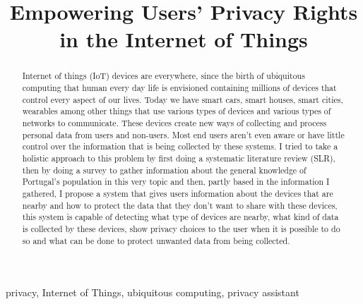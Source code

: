 \documentclass[conference]{IEEEtran}
\begin{document}
\title{Empowering Users' Privacy Rights in the Internet of Things\\
}

\author{
}

\maketitle

\begin{abstract}
Internet of things (IoT) devices are everywhere, since the birth of ubiquitous
computing that human every day life is envisioned containing millions of devices
that control every aspect of our lives. Today we have smart cars, smart houses,
smart cities, wearables among other things that use various types of devices
and various types of networks to communicate. These devices create new ways
of collecting and process personal data from users and non-users.
Most end users aren't even aware or have little control over the information that
is being collected by these systems. I tried to take a holistic approach to this
problem by first doing a systematic literature review (SLR), then by doing a survey to gather
information about the general knowledge of Portugal's population in this
very topic and then, partly based in the information I gathered, I propose
a system that gives users information about the devices that are nearby
and how to protect the data that they don't want to share with these devices,
this system is capable of detecting what type of devices are nearby,
what kind of data is collected by these devices, show privacy choices
to the user when it is possible to do so and what can be done to protect
unwanted data from being collected.
\end{abstract}

\begin{IEEEkeywords}
privacy, Internet of Things, ubiquitous computing, privacy assistant
\end{IEEEkeywords}
\end{document}
